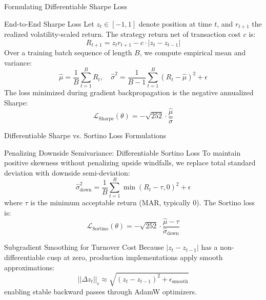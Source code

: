 \documentclass[10pt]{beamer}
\begin{document}
\begin{frame}{Formulating Differentiable Sharpe Loss}
  \begin{block}{End-to-End Sharpe Loss}
    Let $z_t \in [-1, 1]$ denote position at time $t$, and $r_{t+1}$ the realized volatility-scaled return. The strategy return net of transaction cost $c$ is:
    \begin{equation*}
      R_{t+1} = z_t r_{t+1} - c \cdot |z_t - z_{t-1}|
    \end{equation*}
    Over a training batch sequence of length $B$, we compute empirical mean and variance:
    \begin{equation*}
      \hat{\mu} = \frac{1}{B} \sum_{t=1}^B R_t, \quad \hat{\sigma}^2 = \frac{1}{B-1} \sum_{t=1}^B (R_t - \hat{\mu})^2 + \epsilon
    \end{equation*}
    The loss minimized during gradient backpropagation is the negative annualized Sharpe:
    \begin{equation*}
      \mathcal{L}_{\text{Sharpe}}(\theta) = -\sqrt{252} \cdot \frac{\hat{\mu}}{\hat{\sigma}}
    \end{equation*}
  \end{block}
\end{frame}

\begin{frame}{Differentiable Sharpe vs. Sortino Loss Formulations}
  \begin{block}{Penalizing Downside Semivariance: Differentiable Sortino Loss}
    To maintain positive skewness without penalizing upside windfalls, we replace total standard deviation with downside semi-deviation:
    \begin{equation*}
      \hat{\sigma}_{\text{down}}^2 = \frac{1}{B} \sum_{t=1}^B \min(R_t - \tau, 0)^2 + \epsilon
    \end{equation*}
    where $\tau$ is the minimum acceptable return (MAR, typically 0). The Sortino loss is:
    \begin{equation*}
      \mathcal{L}_{\text{Sortino}}(\theta) = -\sqrt{252} \cdot \frac{\hat{\mu} - \tau}{\hat{\sigma}_{\text{down}}}
    \end{equation*}
  \end{block}
  \begin{block}{Subgradient Smoothing for Turnover Cost}
    Because $|z_t - z_{t-1}|$ has a non-differentiable cusp at zero, production implementations apply smooth approximations:
    \begin{equation*}
      ||\Delta z_t||_{\epsilon} \approx \sqrt{(z_t - z_{t-1})^2 + \epsilon_{\text{smooth}}}
    \end{equation*}
    enabling stable backward passes through AdamW optimizers.
  \end{block}
\end{frame}
\end{document}
